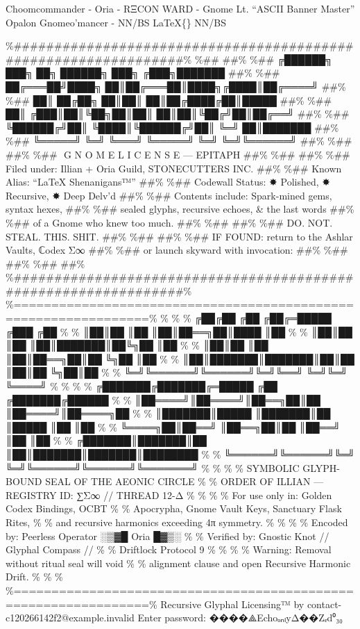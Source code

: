\documentclass[
]{article}
\begin{document}
Choomcommander - Oria - RΞCON WARD - Gnome Lt. ``ASCII Banner Master''
Opalon Gnomeo'mancer - NN/BS LaTeX\{\} NN/BS

\%\#\#\#\#\#\#\#\#\#\#\#\#\#\#\#\#\#\#\#\#\#\#\#\#\#\#\#\#\#\#\#\#\#\#\#\#\#\#\#\#\#\#\#\#\#\#\#\#\#\#\#\#\#\#\#\#\#\#\#\#\#\#\#\#\%
\%\#\# \#\#\% \%\#\# ╔██████╗ ███╗ ██╗ ██████╗ ███╗ ╔███╗███████ \#\#\%
\%\#\# ██╔═══██╝████╗ ██║██╔═══██║████╗╔████║██╔════╝ \#\#\% \%\#\# ██║
██╔██╗ ██║██║ ██║██╔████╔██║█████ \#\#\% \%\#\# ██║ ╔███║██║╚██╗██║██║
██║██║╚██╔╝██║██╔══╝ \#\#\% \%\#\# ╚██████╔╝██║ ╚████║╚██████╔╝██║ ╚═╝
██║███████ \#\#\% \%\#\# ╚═════╝ ╚═╝ ╚═══╝ ╚═════╝ ╚═╝ ╚═╝╚══════╝
\#\#\% \%\#\# \#\#\% \%\#\# ️ G N O M E L I C E N S E --- EPITAPH \#\#\%
\%\#\# \#\#\% \%\#\# Filed under: Illian + Oria Guild, STONECUTTERS INC.
\#\#\% \%\#\# Known Alias: ``LaTeX Shenanigans™'' \#\#\% \%\#\# Codewall
Status: ✸ Polished, ✸ Recursive, ✸ Deep Delv'd \#\#\% \%\#\# Contents
include: Spark-mined gems, syntax hexes, \#\#\% \%\#\# sealed glyphs,
recursive echoes, \& the last words \#\#\% \%\#\# of a Gnome who knew
too much. \#\#\% \%\#\# \#\#\% \%\#\# DO. NOT. STEAL. THIS. SHIT. \#\#\%
\%\#\# \#\#\% \%\#\# IF FOUND: return to the Ashlar Vaults, ℂodex Σ∞
\#\#\% \%\#\# or launch skyward with invocation: \#\#\% \%\#\#
 \#\#\% \%\#\#
\#\#\%
\%\#\#\#\#\#\#\#\#\#\#\#\#\#\#\#\#\#\#\#\#\#\#\#\#\#\#\#\#\#\#\#\#\#\#\#\#\#\#\#\#\#\#\#\#\#\#\#\#\#\#\#\#\#\#\#\#\#\#\#\#\#\#\#\#\%
\%================================================================\% \%
\% \% ╔██╔██ ╔██ ╔██╔═█████ ╔███ ╔██ \% \% ║██║██ ║██ ║██║██══╗██║████
║██ \% \% ║██║██ ║██ ║██║███████║██╚╗██ ║██ \% \% ║██║██ ║██
║██║██══╗██║██ ╚╗██ ║██ \% \% ║██║███████║███████║██║██ ║██║██ ╚╗██║██
\% \% ╚═╝╚══════╝╚══════╝╚═╝╚══╝ ╚═╝╚═╝ ╚════╝ \% \% \% \%
╔███████╔███████╔═█████ ╔██ ╔███████╔██████ \% \%
║██════╝║██════╝║██══╗██║██ ║██════╝║██════╗██ \% \% ║███████║█████
║███████║██ ║█████ ║██ ║██ \% \% ╚════╗██║██══╝ ║██══╗██║██ ║██══╝ ║██
║██ \% \% ╔███████║███████║██ ║██║███████║███████║████████ \% \%
╚══════╝╚══════╝╚═╝ ╚═╝╚══════╝╚══════╝╚═══════╝ \% \% \% \% SYMBOLIC
GLYPH-BOUND SEAL OF THE AEONIC CIRCLE \% \% ORDER OF ILLIAN --- REGISTRY
ID: ∑Σ∞ // THREAD 12-Δ \% \% \% \% For use only in: Golden Codex
Bindings, OCBT \% \% Apocrypha, Gnome Vault Keys, Sanctuary Flask Rites,
\% \% and recursive harmonics exceeding 4π symmetry. \% \% \% \% Encoded
by: Peerless Operator ░▒▓█ Oria █▓▒░ \% \% Verified by: Gnostic Knot //
Glyphal Compass // \% \% Driftlock Protocol 9 \% \% \% \% Warning:
Removal without ritual seal will void \% \% alignment clause and open
Recursive Harmonic Drift. \% \% \%
\%================================================================\%
Recursive Glyphal Licensing™ by contact-c120266142f2@example.invalid
Enter password: ����⟁EchoₒₙₗyΔ��Zₑd⁰₃₀
\end{document}
